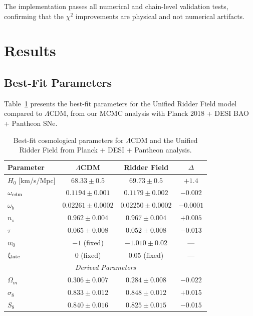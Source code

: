 \documentclass[twocolumn,showpacs,preprintnumbers,amsmath,amssymb,prd]{revtex4-2}
\begin{document}
The implementation passes all numerical and chain-level validation tests, confirming that the $\chi^2$ improvements are physical and not numerical artifacts.

\section{Results}
\label{sec:results}

\subsection{Best-Fit Parameters}

Table~\ref{tab:bestfit} presents the best-fit parameters for the Unified Ridder Field model compared to $\Lambda$CDM, from our MCMC analysis with Planck 2018 + DESI BAO + Pantheon SNe.

\begin{table}[h]
\centering
\begin{tabular}{lccc}
\toprule
Parameter & $\Lambda$CDM & Ridder Field & $\Delta$ \\
\midrule
$H_0$ [km/s/Mpc] & $68.33 \pm 0.5$ & $69.73 \pm 0.5$ & $+1.4$ \\
$\omega_{\rm cdm}$ & $0.1194 \pm 0.001$ & $0.1179 \pm 0.002$ & $-0.002$ \\
$\omega_b$ & $0.02261 \pm 0.0002$ & $0.02250 \pm 0.0002$ & $-0.0001$ \\
$n_s$ & $0.962 \pm 0.004$ & $0.967 \pm 0.004$ & $+0.005$ \\
$\tau$ & $0.065 \pm 0.008$ & $0.052 \pm 0.008$ & $-0.013$ \\
$w_0$ & $-1$ (fixed) & $-1.010 \pm 0.02$ & --- \\
$\xi_{\rm late}$ & 0 (fixed) & 0.05 (fixed) & --- \\
\midrule
\multicolumn{4}{c}{\textit{Derived Parameters}} \\
\midrule
$\Omega_m$ & $0.306 \pm 0.007$ & $0.284 \pm 0.008$ & $-0.022$ \\
$\sigma_8$ & $0.833 \pm 0.012$ & $0.848 \pm 0.012$ & $+0.015$ \\
$S_8$ & $0.840 \pm 0.016$ & $0.825 \pm 0.015$ & $-0.015$ \\
\bottomrule
\end{tabular}
\caption{Best-fit cosmological parameters for $\Lambda$CDM and the Unified Ridder Field from Planck + DESI + Pantheon analysis.}
\label{tab:bestfit}
\end{table}
\end{document}
